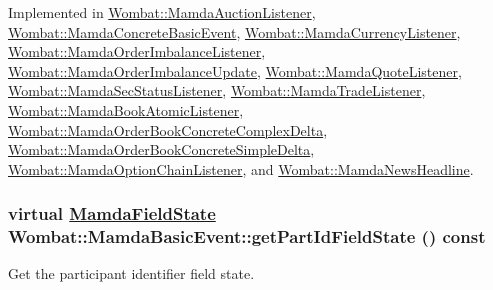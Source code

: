 Implemented in \hyperlink{classWombat_1_1MamdaAuctionListener_e009ff1afdcd5b44383b46177749feac}{Wombat::Mamda\-Auction\-Listener}, \hyperlink{classWombat_1_1MamdaConcreteBasicEvent_78269392b05726fb1a17ca054beffcdf}{Wombat::Mamda\-Concrete\-Basic\-Event}, \hyperlink{classWombat_1_1MamdaCurrencyListener_2a5ec025f8c088274a68563ebe51f063}{Wombat::Mamda\-Currency\-Listener}, \hyperlink{classWombat_1_1MamdaOrderImbalanceListener_2f47719f14e5d1280791c8d832522589}{Wombat::Mamda\-Order\-Imbalance\-Listener}, \hyperlink{classWombat_1_1MamdaOrderImbalanceUpdate_227deba90a0c151d51e60505c296e734}{Wombat::Mamda\-Order\-Imbalance\-Update}, \hyperlink{classWombat_1_1MamdaQuoteListener_7d1a662d35580eaf5d03260c977999a6}{Wombat::Mamda\-Quote\-Listener}, \hyperlink{classWombat_1_1MamdaSecStatusListener_26936960eb39c5972eff2a4da4036fd3}{Wombat::Mamda\-Sec\-Status\-Listener}, \hyperlink{classWombat_1_1MamdaTradeListener_9fc3574e811a832c3b7244ebf3dd849d}{Wombat::Mamda\-Trade\-Listener}, \hyperlink{classWombat_1_1MamdaBookAtomicListener_b976bfe1cf039410ca1c586214d6f2f2}{Wombat::Mamda\-Book\-Atomic\-Listener}, \hyperlink{classWombat_1_1MamdaOrderBookConcreteComplexDelta_caacf40ac5c44468404832849d4d738e}{Wombat::Mamda\-Order\-Book\-Concrete\-Complex\-Delta}, \hyperlink{classWombat_1_1MamdaOrderBookConcreteSimpleDelta_ae9efb06f1eeb2d5bd36c97639703627}{Wombat::Mamda\-Order\-Book\-Concrete\-Simple\-Delta}, \hyperlink{classWombat_1_1MamdaOptionChainListener_742fc512426cd4b38cdddc67747ea269}{Wombat::Mamda\-Option\-Chain\-Listener}, and \hyperlink{classWombat_1_1MamdaNewsHeadline_5c2e3274fa3d55033e98b2e2e45602d7}{Wombat::Mamda\-News\-Headline}.\hypertarget{classWombat_1_1MamdaBasicEvent_c361c99af2cf7eb9f5621d89f744fc62}{
\subsubsection[getPartIdFieldState]{\setlength{\rightskip}{0pt plus 5cm}virtual \hyperlink{namespaceWombat_93aac974f2ab713554fd12a1fa3b7d2a}{Mamda\-Field\-State} Wombat::Mamda\-Basic\-Event::get\-Part\-Id\-Field\-State () const}}
\label{classWombat_1_1MamdaBasicEvent_c361c99af2cf7eb9f5621d89f744fc62}


Get the participant identifier field state. 

